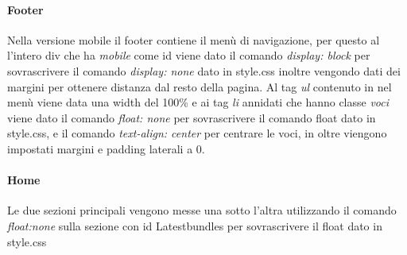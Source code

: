 \paragraph{Footer} \Spazio
Nella versione mobile il footer contiene il menù di navigazione, per questo al l'intero div che ha \emph{mobile} come id viene dato il comando \emph{display: block} per sovrascrivere il comando \emph{display: none} dato in style.css inoltre vengondo dati dei margini per ottenere distanza dal resto della pagina.
Al tag \emph{ul} contenuto in nel menù viene data una width del 100\% e ai tag \emph{li} annidati che hanno classe \emph{voci} viene dato il comando \emph{float: none} per sovrascrivere il comando float dato in style.css, e il comando \emph{text-align: center} per centrare le voci, in oltre viengono impostati margini e padding laterali a 0.

\paragraph{Home} \Spazio
Le due sezioni principali vengono messe una sotto l'altra utilizzando il comando \emph{float:none} sulla sezione con id Latestbundles per sovrascrivere il float dato in style.css


